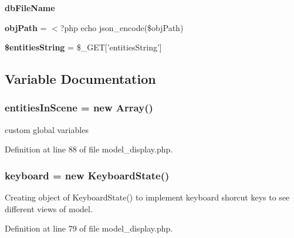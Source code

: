 \begin{DoxyCompactItemize}
\item 
\hypertarget{model__display_8php_a449d9e9473792f0a2b1a61a2d401bd81}{{\bfseries db\-File\-Name}}\label{model__display_8php_a449d9e9473792f0a2b1a61a2d401bd81}

\item 
\hypertarget{model__display_8php_aa2869b05f772ae0666ce6ace22a1fbec}{{\bfseries obj\-Path} = $<$?php echo json\-\_\-encode(\$obj\-Path)}\label{model__display_8php_aa2869b05f772ae0666ce6ace22a1fbec}

\item 
\hypertarget{model__display_8php_af9e0b031c25b0109bd867dde7c995608}{{\bfseries \$entities\-String} = \$\-\_\-\-G\-E\-T\mbox{[}'entities\-String'\mbox{]}}\label{model__display_8php_af9e0b031c25b0109bd867dde7c995608}

\end{DoxyCompactItemize}


\subsection{Variable Documentation}
\hypertarget{model__display_8php_a979a99c92317f74763728af573f3ddb4}{
\subsubsection[{entities\-In\-Scene}]{\setlength{\rightskip}{0pt plus 5cm}entities\-In\-Scene = new Array()}}\label{model__display_8php_a979a99c92317f74763728af573f3ddb4}
custom global variables 

Definition at line 88 of file model\-\_\-display.\-php.

\hypertarget{model__display_8php_a9976f3faad68f981f425583e48b03252}{
\subsubsection[{keyboard}]{\setlength{\rightskip}{0pt plus 5cm}keyboard = new Keyboard\-State()}}\label{model__display_8php_a9976f3faad68f981f425583e48b03252}
Creating object of Keyboard\-State() to implement keyboard shorcut keys to see different views of model. 

Definition at line 79 of file model\-\_\-display.\-php.

